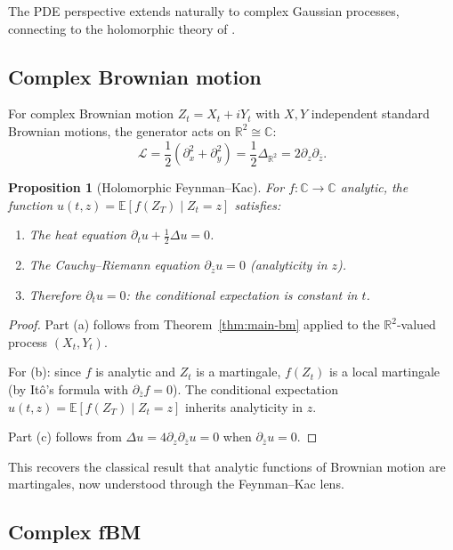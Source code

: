 \documentclass[11pt]{article}
\newtheorem{proposition}[theorem]{Proposition}
\theoremstyle{definition}
\newcommand{\E}{\mathbb{E}}
\begin{document}
The PDE perspective extends naturally to complex Gaussian processes, connecting to the holomorphic theory of \cite{PaperV}.

\subsection{Complex Brownian motion}

For complex Brownian motion $Z_t = X_t + iY_t$ with $X, Y$ independent standard Brownian motions, the generator acts on $\mathbb{R}^2 \cong \mathbb{C}$:
\begin{equation}
\mathcal{L} = \frac{1}{2}(\partial_x^2 + \partial_y^2) = \frac{1}{2}\Delta_{\mathbb{R}^2} = 2\partial_z\partial_{\bar{z}}.
\end{equation}

\begin{proposition}[Holomorphic Feynman--Kac]
For $f : \mathbb{C} \to \mathbb{C}$ analytic, the function $u(t,z) = \E[f(Z_T) \mid Z_t = z]$ satisfies:
\begin{enumerate}
\item[(a)] The heat equation $\partial_t u + \frac{1}{2}\Delta u = 0$.
\item[(b)] The Cauchy--Riemann equation $\partial_{\bar{z}} u = 0$ (analyticity in $z$).
\item[(c)] Therefore $\partial_t u = 0$: the conditional expectation is constant in $t$.
\end{enumerate}
\end{proposition}

\begin{proof}
Part (a) follows from Theorem~\ref{thm:main-bm} applied to the $\mathbb{R}^2$-valued process $(X_t, Y_t)$.

For (b): since $f$ is analytic and $Z_t$ is a martingale, $f(Z_t)$ is a local martingale (by It\^o's formula with $\partial_{\bar{z}}f = 0$). The conditional expectation $u(t,z) = \E[f(Z_T) \mid Z_t = z]$ inherits analyticity in $z$.

Part (c) follows from $\Delta u = 4\partial_z\partial_{\bar{z}} u = 0$ when $\partial_{\bar{z}} u = 0$.
\end{proof}

This recovers the classical result that analytic functions of Brownian motion are martingales, now understood through the Feynman--Kac lens.

\subsection{Complex fBM}
\end{document}
